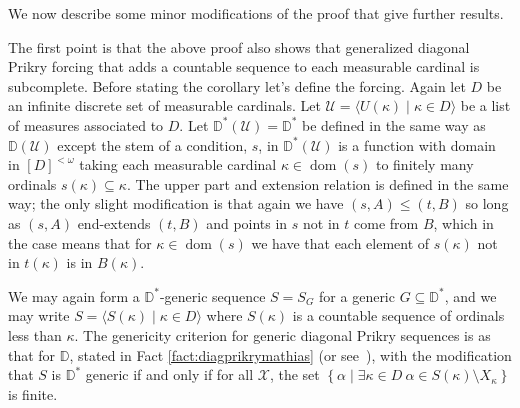 \documentclass{amsart}
\theoremstyle{definition}
\theoremstyle{remark}
\newcommand{\D}{\mathbb{D}}
\newcommand{\U}{\mathcal{U}}
\DeclareMathOperator{\dom}{dom}
\newcommand{\st}{\; | \;}
\newcommand{\set}[2]{\left\{#1\st #2 \right\}}
\newcommand{\seq}[2]{\langle #1 \st #2 \rangle}
\begin{document}
We now describe some minor modifications of the proof that give further results.

The first point is that the above proof also shows that generalized diagonal Prikry forcing that adds a countable sequence to each measurable cardinal is subcomplete. Before stating the corollary let's define the forcing. Again let $D$ be an infinite discrete set of measurable cardinals. Let $\U = \seq{ U(\kappa) }{ \kappa \in D }$ be a list of measures associated to $D$. 
Let $\D^*(\U) = \D^*$ be defined in the same way as $\D(\U)$ except the stem of a condition, $s$, in $\D^*(\U)$ is a function with domain in $[D]^{<\omega}$ taking each measurable cardinal $\kappa \in \dom(s)$ to finitely many ordinals $s(\kappa) \subseteq \kappa$. The upper part and extension relation is defined in the same way; the only slight modification is that again we have $(s, A) \leq (t, B)$ so long as $(s, A)$ end-extends $(t, B)$ and points in $s$ not in $t$ come from $B$, which in the case means that for $\kappa \in \dom(s)$ we have that each element of $s(\kappa)$ not in $t(\kappa)$ is in $B(\kappa)$. 

We may again form a $\D^*$-generic sequence $S = S_G$ for a generic $G \subseteq \D^*$, and we may write $S = \seq{ S(\kappa) }{ \kappa \in D }$ where $S(\kappa)$ is a countable sequence of ordinals less than $\kappa$. The genericity criterion for generic diagonal Prikry sequences is as that for $\D$, stated in Fact \ref{fact:diagprikrymathias} (or see~\cite[Thm.~1]{Fuchs:2005kx}), with the modification that $S$ is $\D^*$ generic if and only if for all $\mathcal X$, the set $\set{ \alpha }{ \exists \kappa \in D \ \alpha \in S(\kappa) \setminus X_\kappa }$ is finite.
\end{document}

